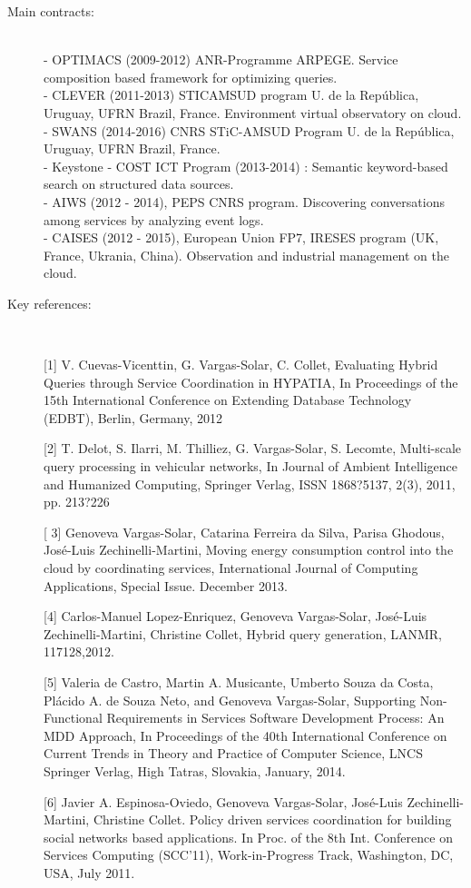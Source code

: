 \begin{description}

\item[Main contracts:] \ \\
- OPTIMACS (2009-2012)	ANR-Programme ARPEGE. Service composition based framework for optimizing queries. \\
- CLEVER (2011-2013) STICAMSUD program  U. de la Rep{\'u}blica, Uruguay, UFRN Brazil, France. Environment virtual observatory on cloud. \\
- SWANS (2014-2016) CNRS STiC-AMSUD Program U. de la Rep{\'u}blica, Uruguay, UFRN Brazil,  France. \\
- Keystone - COST ICT Program (2013-2014) : Semantic keyword-based search on structured data sources. \\
- AIWS (2012 - 2014), PEPS  CNRS program. Discovering conversations among services by analyzing event logs.\\
- CAISES (2012 - 2015), European Union FP7, IRESES program (UK, France, Ukrania, China). Observation and industrial management on the cloud.  

\item[Key references:]~%

[1] V. Cuevas-Vicenttin, G.  Vargas-Solar, C. Collet, Evaluating Hybrid Queries through Service Coordination in HYPATIA, In Proceedings of the 15th International Conference on Extending Database Technology (EDBT), Berlin, Germany, 2012

[2] T. Delot, S. Ilarri, M. Thilliez, G.  Vargas-Solar, S. Lecomte, Multi-scale query processing in vehicular networks, In Journal of Ambient Intelligence and Humanized Computing, Springer Verlag, ISSN 1868?5137, 2(3), 2011, pp. 213?226

[ 3]	Genoveva Vargas-Solar, Catarina Ferreira da Silva, Parisa Ghodous, Jos{\'e}-Luis Zechinelli-Martini, Moving energy consumption control into the cloud by coordinating services, International Journal of Computing Applications, Special Issue. December 2013.

[4] Carlos-Manuel Lopez-Enriquez, Genoveva Vargas-Solar, Jos{\'e}-Luis Zechinelli-Martini, Christine Collet, Hybrid query generation,  LANMR,  117128,2012.

[5] Valeria de Castro, Martin A. Musicante, Umberto Souza da Costa, Pl{\'a}cido A. de Souza Neto, and Genoveva Vargas-Solar, Supporting Non-Functional Requirements in Services Software Development Process: An MDD Approach, In Proceedings of the 40th International Conference on Current Trends in Theory and Practice of Computer Science,  LNCS Springer Verlag, High Tatras, Slovakia, January, 2014. 

[6] Javier A. Espinosa-Oviedo, Genoveva Vargas-Solar, Jos{\'e}-Luis Zechinelli-Martini, Christine Collet. Policy driven services coordination for building social networks based applications. In Proc. of the 8th Int. Conference on Services Computing (SCC'11), Work-in-Progress Track, Washington, DC, USA, July 2011.
\end{description}

